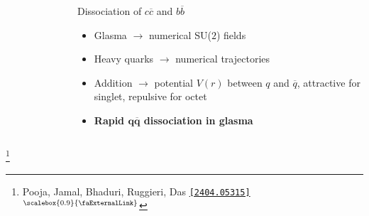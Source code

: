 \documentclass[aspectratio=169,11pt,usenames,dvipsnames]{beamer}
\renewcommand{\thefootnote}{\color{customblue}\faPaperPlaneO}
\newcommand\blfootnote[1]{%
  \begingroup
  \renewcommand\thefootnote{}\footnote{#1}%
  \addtocounter{footnote}{-1}%
  \endgroup
}
\begin{document}
\begin{frame}[t,noframenumbering]
\begin{columns}[onlytextwidth,t]
\begin{figure}
        \end{figure}
        \begin{center}
            {\Large\color{isgold} Dissociation of $c\overline{c}$ and $b\overline{b}$ \\[10pt]}
            \footnotesize
                \begin{itemize}
                    \item {\color{lightgray}Glasma $\rightarrow$ numerical SU($2$) fields}
                    \item {\color{lightgray}Heavy quarks $\rightarrow$ numerical trajectories}
                    \item {\color{lightgray}Addition $\rightarrow$ potential $V(r)$ between $q$ and $\overline{q}$, attractive for singlet, repulsive for octet}\\[15pt]
                    \item {\color{destacado}\bfseries\normalsize{Rapid $\boldsymbol{q\overline{q}}$ dissociation in glasma}}
                \end{itemize}
        \end{center}
    \end{columns}
    \blfootnote{\scriptsize Pooja, Jamal, Bhaduri, Ruggieri, Das \href{https://arxiv.org/abs/2404.05315}{\color{palgold}\texttt{[2404.05315]}$^\text{\scalebox{0.9}{\faExternalLink}}$}}
\end{frame}
\end{document}
